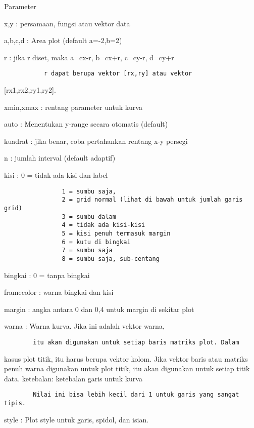 \documentclass[
]{book}
\begin{document}
Parameter

x,y : persamaan, fungsi atau vektor data

a,b,c,d : Area plot (default a=-2,b=2)

r : jika r diset, maka a=cx-r, b=cx+r, c=cy-r, d=cy+r

\begin{verbatim}
           r dapat berupa vektor [rx,ry] atau vektor
\end{verbatim}

{[}rx1,rx2,ry1,ry2{]}.

xmin,xmax : rentang parameter untuk kurva

auto : Menentukan y-range secara otomatis (default)

kuadrat : jika benar, coba pertahankan rentang x-y persegi

n : jumlah interval (default adaptif)

kisi : 0 = tidak ada kisi dan label

\begin{verbatim}
                1 = sumbu saja,
                2 = grid normal (lihat di bawah untuk jumlah garis grid)
                3 = sumbu dalam
                4 = tidak ada kisi-kisi
                5 = kisi penuh termasuk margin
                6 = kutu di bingkai
                7 = sumbu saja
                8 = sumbu saja, sub-centang
\end{verbatim}

bingkai : 0 = tanpa bingkai

framecolor : warna bingkai dan kisi

margin : angka antara 0 dan 0,4 untuk margin di sekitar plot

warna : Warna kurva. Jika ini adalah vektor warna,

\begin{verbatim}
        itu akan digunakan untuk setiap baris matriks plot. Dalam
\end{verbatim}

kasus plot titik, itu harus berupa vektor kolom. Jika vektor baris atau matriks penuh warna digunakan untuk plot titik, itu akan digunakan untuk setiap titik data. ketebalan: ketebalan garis untuk kurva

\begin{verbatim}
        Nilai ini bisa lebih kecil dari 1 untuk garis yang sangat tipis.
\end{verbatim}

style : Plot style untuk garis, spidol, dan isian.
\end{document}
